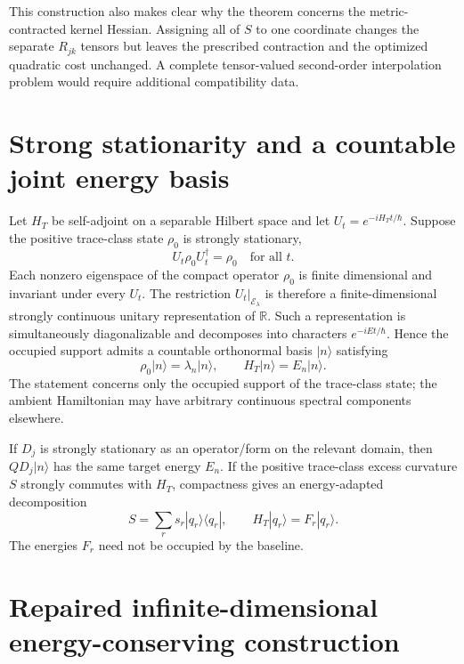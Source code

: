 \documentclass[aps,pra,preprint,nofootinbib]{revtex4-2}
\newcommand{\rhozero}{\rho_0}
\begin{document}
This construction also makes clear why the theorem concerns the metric-contracted kernel Hessian. Assigning all of $S$ to one coordinate changes the separate $R_{jk}$ tensors but leaves the prescribed contraction and the optimized quadratic cost unchanged. A complete tensor-valued second-order interpolation problem would require additional compatibility data.

\section{Strong stationarity and a countable joint energy basis}

Let $H_T$ be self-adjoint on a separable Hilbert space and let $U_t=e^{-iH_Tt/\hbar}$. Suppose the positive trace-class state $\rhozero$ is strongly stationary,
\begin{equation}
 U_t\rhozero U_t^\dagger=\rhozero\quad\text{for all }t.
\end{equation}
Each nonzero eigenspace of the compact operator $\rhozero$ is finite dimensional and invariant under every $U_t$. The restriction $U_t|_{\mathcal E_\lambda}$ is therefore a finite-dimensional strongly continuous unitary representation of $\mathbb R$. Such a representation is simultaneously diagonalizable and decomposes into characters $e^{-iEt/\hbar}$. Hence the occupied support admits a countable orthonormal basis $|n\rangle$ satisfying
\begin{equation}
 \rhozero|n\rangle=\lambda_n|n\rangle,
 \qquad
 H_T|n\rangle=E_n|n\rangle.
 \label{eq:sup-jointbasis}
\end{equation}
The statement concerns only the occupied support of the trace-class state; the ambient Hamiltonian may have arbitrary continuous spectral components elsewhere.

If $D_j$ is strongly stationary as an operator/form on the relevant domain, then $QD_j|n\rangle$ has the same target energy $E_n$. If the positive trace-class excess curvature $S$ strongly commutes with $H_T$, compactness gives an energy-adapted decomposition
\begin{equation}
 S=\sum_rs_r|q_r\rangle\langle q_r|,
 \qquad H_T|q_r\rangle=F_r|q_r\rangle.
 \label{eq:sup-Senergy}
\end{equation}
The energies $F_r$ need not be occupied by the baseline.

\section{Repaired infinite-dimensional energy-conserving construction}
\end{document}
